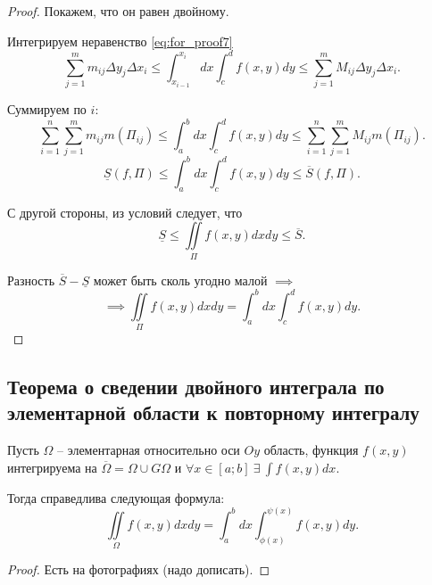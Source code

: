 \begin{proof}
    Покажем, что он равен двойному.

    Интегрируем неравенство \ref{eq:for_proof7}
    \[
        \sum_{j=1}^{m}m_{ij}\Delta y_j\Delta x_i \leqslant \int_{x_{i-1}}^{x_i}dx \int_{c}^{d}f(x,y)dy \leqslant \sum_{j=1}^{m}M_{ij}\Delta y_j \Delta x_i.
    \]

    Суммируем по $ i $:
    \[
        \sum_{i=1}^{n}\sum_{j=1}^{m}m_{ij} m(\Pi_{ij}) \leqslant \int_{a}^{b}dx \int_{c}^{d} f(x,y)dy \leqslant \sum_{i=1}^{n}\sum_{j=1}^{m}M_{ij}m(\Pi_{ij}).
    \]
    \[
        \underline{S}(f,\Pi) \leqslant \int_{a}^{b}dx \int_{c}^{d}f(x,y)dy \leqslant \overline{S}(f,\Pi).
    \]

    С другой стороны, из условий следует, что
    \[
        \underline{S} \leqslant \iint\limits_\Pi f(x,y)dxdy \leqslant \overline{S}.
    \]

    Разность $ \overline{S} - \underline{S} $ может быть сколь угодно малой $ \implies $
    \[
        \implies \iint\limits_\Pi f(x,y)dxdy = \int_{a}^{b}dx \int_{c}^{d}f(x,y)dy.
    \]
\end{proof}

\subsection{Теорема о сведении двойного интеграла по элементарной области к повторному интегралу}

\begin{theorem}
    Пусть $ \Omega $ -- элементарная относительно оси $ Oy $ область, функция $ f(x,y) $ интегрируема на $ \overline{\Omega} = \Omega \cup G\Omega $ и $ \forall x \in [a;b] \ \exists \ \int f(x,y)dx $.

    Тогда справедлива следующая формула:
    \begin{equation}\label{eq:for_proof9}
        \iint\limits_\Omega f(x,y)dxdy = \int_{a}^{b}dx \int_{\phi(x)}^{\psi(x)}f(x,y)dy.
    \end{equation}
\end{theorem}

\begin{proof}
    Есть на фотографиях (надо дописать).
\end{proof}
